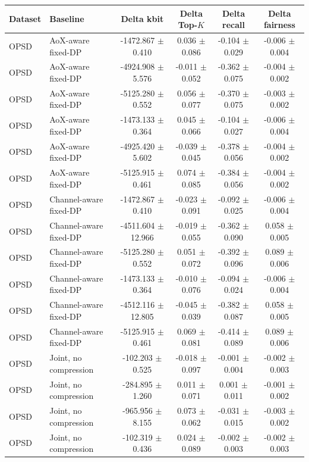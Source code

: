 \begin{tabular}{llcccc}
\toprule
Dataset & Baseline & Delta kbit & Delta Top-$K$ & Delta recall & Delta fairness \\
\midrule
OPSD & AoX-aware fixed-DP & -1472.867 $\pm$ 0.410 & 0.036 $\pm$ 0.086 & -0.104 $\pm$ 0.029 & -0.006 $\pm$ 0.004 \\
OPSD & AoX-aware fixed-DP & -4924.908 $\pm$ 5.576 & -0.011 $\pm$ 0.052 & -0.362 $\pm$ 0.075 & -0.004 $\pm$ 0.002 \\
OPSD & AoX-aware fixed-DP & -5125.280 $\pm$ 0.552 & 0.056 $\pm$ 0.077 & -0.370 $\pm$ 0.075 & -0.003 $\pm$ 0.002 \\
OPSD & AoX-aware fixed-DP & -1473.133 $\pm$ 0.364 & 0.045 $\pm$ 0.066 & -0.104 $\pm$ 0.027 & -0.006 $\pm$ 0.004 \\
OPSD & AoX-aware fixed-DP & -4925.420 $\pm$ 5.602 & -0.039 $\pm$ 0.045 & -0.378 $\pm$ 0.056 & -0.004 $\pm$ 0.002 \\
OPSD & AoX-aware fixed-DP & -5125.915 $\pm$ 0.461 & 0.074 $\pm$ 0.085 & -0.384 $\pm$ 0.056 & -0.004 $\pm$ 0.002 \\
OPSD & Channel-aware fixed-DP & -1472.867 $\pm$ 0.410 & -0.023 $\pm$ 0.091 & -0.092 $\pm$ 0.025 & -0.006 $\pm$ 0.004 \\
OPSD & Channel-aware fixed-DP & -4511.604 $\pm$ 12.966 & -0.019 $\pm$ 0.055 & -0.362 $\pm$ 0.090 & 0.058 $\pm$ 0.005 \\
OPSD & Channel-aware fixed-DP & -5125.280 $\pm$ 0.552 & 0.051 $\pm$ 0.072 & -0.392 $\pm$ 0.096 & 0.089 $\pm$ 0.006 \\
OPSD & Channel-aware fixed-DP & -1473.133 $\pm$ 0.364 & -0.010 $\pm$ 0.076 & -0.094 $\pm$ 0.024 & -0.006 $\pm$ 0.004 \\
OPSD & Channel-aware fixed-DP & -4512.116 $\pm$ 12.805 & -0.045 $\pm$ 0.039 & -0.382 $\pm$ 0.087 & 0.058 $\pm$ 0.005 \\
OPSD & Channel-aware fixed-DP & -5125.915 $\pm$ 0.461 & 0.069 $\pm$ 0.081 & -0.414 $\pm$ 0.089 & 0.089 $\pm$ 0.006 \\
OPSD & Joint, no compression & -102.203 $\pm$ 0.525 & -0.018 $\pm$ 0.097 & -0.001 $\pm$ 0.004 & -0.002 $\pm$ 0.003 \\
OPSD & Joint, no compression & -284.895 $\pm$ 1.260 & 0.011 $\pm$ 0.071 & 0.001 $\pm$ 0.011 & -0.001 $\pm$ 0.002 \\
OPSD & Joint, no compression & -965.956 $\pm$ 8.155 & 0.073 $\pm$ 0.062 & -0.031 $\pm$ 0.015 & -0.003 $\pm$ 0.002 \\
OPSD & Joint, no compression & -102.319 $\pm$ 0.436 & 0.024 $\pm$ 0.089 & -0.002 $\pm$ 0.003 & -0.002 $\pm$ 0.003 \\

\end{tabular}
